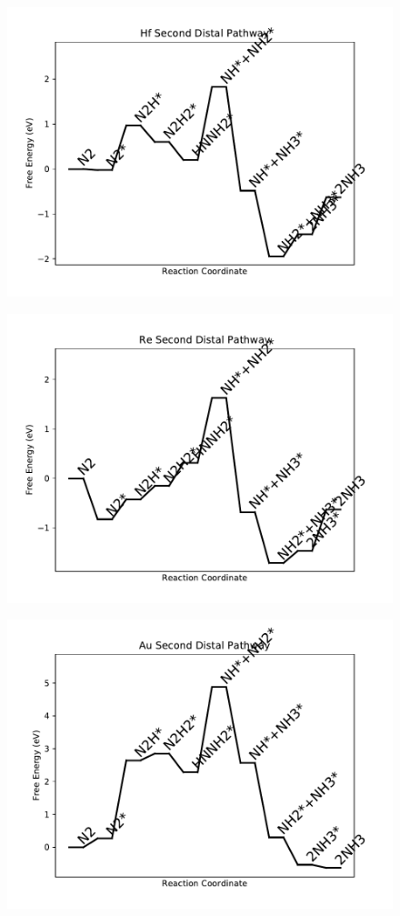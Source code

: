 \begin{figure}
\includegraphics[width=0.8\linewidth]{data/plots/Hf_distal_2.pdf}
\end{figure}

\begin{figure}
\includegraphics[width=0.8\linewidth]{data/plots/Re_distal_2.pdf}
\end{figure}

\begin{figure}
\includegraphics[width=0.8\linewidth]{data/plots/Au_distal_2.pdf}
\end{figure}

